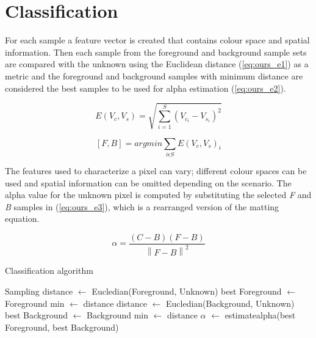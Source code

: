 \section{Classification}
\label{sec:classification}

For each sample a feature vector is created that contains colour space and spatial information. Then each sample from the foreground and background sample sets are compared with the unknown using the Euclidean distance (\ref{eq:ours_e1}) as a metric and the foreground and background samples with minimum distance are considered the best samples to be used for alpha estimation (\ref{eq:ours_e2}).

\begin{equation} \label{eq:ours_e1}
E(V_{c},V_{s})=\sqrt{\sum_{i=1}^{S}(V_{c_i}-V_{s_i})^{2}}
\end{equation}

\begin{equation} \label{eq:ours_e2}
[F,B]=argmin\sum _{i\epsilon S}E(V_c,V_s)_{i}
\end{equation}

The features used to characterize a pixel can vary; different colour spaces can be used and spatial information can be omitted depending on the scenario. The alpha value for the unknown pixel is computed by substituting the selected \textit{F} and \textit{B} samples in (\ref{eq:ours_e3}), which is a rearranged version of the matting equation. 

\begin{equation} \label{eq:ours_e3}
\alpha=\frac{(C-B)(F-B)}{\left \| F-B \right \|^{2}}
\end{equation}

\begin{algorithm}
\caption{Classification algorithm}\label{classification-algorithm}
\begin{algorithmic}[1]
\State Sampling
\State distance $\gets$ Eucledian(Foreground, Unknown)
\State best Foreground $\gets$ Foreground
\State min $\gets$ distance
\EndIf
\EndFor
{}
\State distance $\gets$ Eucledian(Background, Unknown)
\State best Background $\gets$ Background
\State min $\gets$ distance
\EndIf
\EndFor
\State $\alpha$ $\gets$ estimate\;alpha(best Foreground, best Background)
\EndFor
\end{algorithmic}
\end{algorithm}

